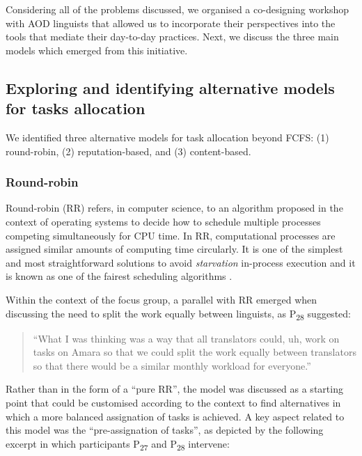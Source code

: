 Considering all of the problems discussed, we organised a co-designing workshop with AOD linguists that allowed us to incorporate their perspectives into the tools that mediate their day-to-day practices. Next, we discuss the three main models which emerged from this initiative.

\subsection{Exploring and identifying alternative models for tasks allocation}
\label{subsec:models}

We identified three alternative models for task allocation beyond FCFS: (1) round-robin, (2) reputation-based, and (3) content-based.

\subsubsection{Round-robin}

Round-robin (RR) refers, in computer science, to an algorithm proposed in the context of operating systems \cite{silberschatz1999applied} to decide how to schedule multiple processes competing simultaneously for CPU time. In RR, computational processes are assigned similar amounts of computing time circularly. It is one of the simplest and most straightforward solutions to avoid \textit{starvation} in-process execution and it is known as one of the fairest scheduling algorithms \cite{tanenbaum2015modern}.

Within the context of the focus group, a parallel with RR emerged when discussing the need to split the work equally between linguists, as P\textsubscript{28} suggested:

\begin{quote}
    ``What I was thinking was a way that all translators could, uh, work on tasks on Amara so that we could split the work equally between translators so that there would be a similar monthly workload for everyone.''
\end{quote}

Rather than in the form of a ``pure RR'', the model was discussed as a starting point that could be customised according to the context to find alternatives in which a more balanced assignation of tasks is achieved. A key aspect related to this model was the ``pre-assignation of tasks'', as depicted by the following excerpt in which participants P\textsubscript{27} and P\textsubscript{28} intervene:

